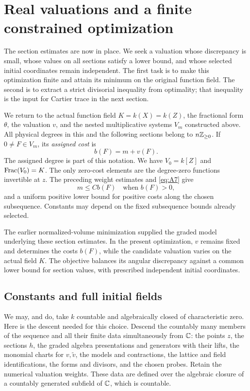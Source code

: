 \section{Real valuations and a finite constrained optimization}
\label{c:optimization-section}

The section estimates are now in place. We seek a valuation whose
discrepancy is small, whose values on all sections satisfy a lower bound,
and whose selected initial coordinates remain independent. The first task
is to make this optimization finite and attain its minimum on the original
function field. The second is to extract a strict divisorial inequality
from optimality; that inequality is the input for Cartier trace in the
next section.

We return to the actual function field
\(K=k(X)=k(Z)\), the fractional form \(\theta\), the valuation \(v\),
and the nested multiplicative systems \(V_m\) constructed above.
All physical degrees in this and the following sections belong to
\(n\mathbb Z_{\ge0}\).  If \(0\ne F\in V_m\), its \emph{assigned cost} is
\[
                         b(F)=m+v(F).
\]
The assigned degree is part of this notation.  We have
\(V_0=k[Z]\) and \(\operatorname{Frac}(V_0)=K\).  The only zero-cost elements
are the degree-zero functions invertible at \(z\).  The preceding
weight estimates and \eqref{eq:A7} give
\[
              m\le Cb(F)\quad\text{when }b(F)>0,
\]
and a uniform positive lower bound for positive costs along the
chosen subsequence.  Constants may depend on the fixed subsequence
bounds already selected.

The earlier normalized-volume minimization supplied the graded model
underlying these section estimates.  In the present optimization,
\(v\) remains fixed and determines the costs \(b(F)\), while the
candidate valuation varies on the actual field \(K\).  The objective
balances its angular discrepancy against a common lower bound for
section values, with prescribed independent initial coordinates.

\subsection{Constants and full initial fields}

We may, and do, take \(k\) countable and algebraically closed of
characteristic zero.  Here is the descent needed for this choice.
Descend the countably many members of the sequence and all their finite
data simultaneously from \(\mathbb C\): the points \(z\), the sections \(h\),
the graded algebra presentations and generators with their lifts,
the monomial charts for \(v,\widetilde v\), the models and contractions,
the lattice and field identifications, the forms and divisors, and the
chosen probes.  Retain the numerical valuation weights.  These data
are defined over the algebraic closure of a countably generated
subfield of \(\mathbb C\), which is countable.

